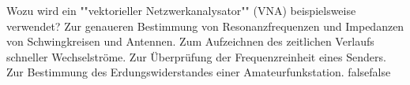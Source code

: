     {Wozu wird ein ""vektorieller Netzwerkanalysator"" (VNA) beispielsweise verwendet?}
    {Zur genaueren Bestimmung von Resonanzfrequenzen und Impedanzen von Schwingkreisen und Antennen.}
    {Zum Aufzeichnen des zeitlichen Verlaufs schneller Wechselströme.}
    {Zur Überprüfung der Frequenzreinheit eines Senders.}
    {Zur Bestimmung des Erdungswiderstandes einer Amateurfunkstation.}
    {false}{false}